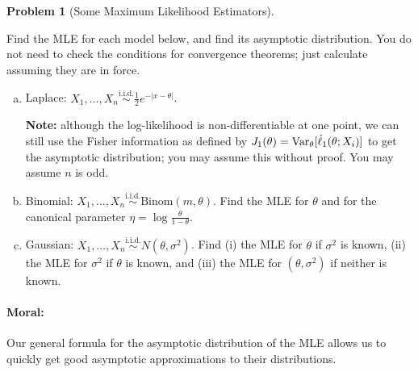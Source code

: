 \documentclass{article}
\newcommand{\Var}{\textnormal{Var}}
\newcommand{\simiid}{\overset{\text{i.i.d.}}{\sim}}
\theoremstyle{definition}
\newtheorem{problem}{Problem}
\begin{document}
\begin{problem}[Some Maximum Likelihood Estimators]
\label{prob:mle-examples}

Find the MLE for each model below, and find its asymptotic distribution. You do not need to check the conditions for convergence theorems; just calculate assuming they are in force.

\begin{enumerate}[(a)]
\item Laplace: $X_1,\ldots,X_n \simiid \frac{1}{2}e^{-|x-\theta|}$.

  {\bf Note:} although the log-likelihood is non-differentiable at one point, we can still use the Fisher information as defined by $J_1(\theta) = \Var_\theta[\dot{\ell}_1(\theta;X_i)]$ to get the asymptotic distribution; you may assume this without proof. You may assume $n$ is odd.



\item Binomial: $X_1,\ldots,X_n \simiid \text{Binom}(m,\theta)$. Find the MLE for $\theta$ and for the canonical parameter $\eta = \log\frac{\theta}{1-\theta}$.



\item Gaussian: $X_1,\ldots,X_n \simiid N(\theta,\sigma^2)$. Find (i) the MLE for $\theta$ if $\sigma^2$ is known, (ii) the MLE for $\sigma^2$ if $\theta$ is known, and (iii) the MLE for $(\theta,\sigma^2)$ if neither is known.




\end{enumerate}

\paragraph{Moral:} Our general formula for the asymptotic distribution of the MLE allows us to quickly get good asymptotic approximations to their distributions.

\end{problem}
\end{document}
